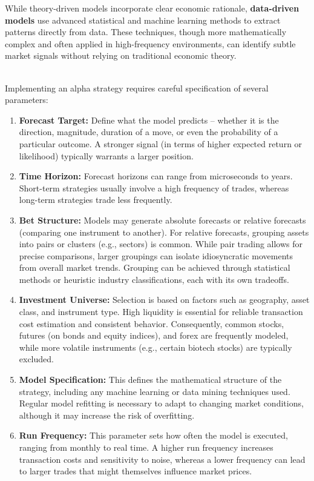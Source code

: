 While theory-driven models incorporate clear economic rationale, \textbf{data-driven models} use advanced statistical and machine learning methods to extract patterns directly from data. These techniques, though more mathematically complex and often applied in high-frequency environments, can identify subtle market signals without relying on traditional economic theory.

\begin{method} \\
Implementing an alpha strategy requires careful specification of several parameters:
\begin{enumerate}[label=\roman*.]
  \setlength{\itemsep}{0pt}
  \item \textbf{Forecast Target:}  
  Define what the model predicts – whether it is the direction, magnitude, duration of a move, or even the probability of a particular outcome. A stronger signal (in terms of higher expected return or likelihood) typically warrants a larger position.

  \item \textbf{Time Horizon:}  
  Forecast horizons can range from microseconds to years. Short-term strategies usually involve a high frequency of trades, whereas long-term strategies trade less frequently.

  \item \textbf{Bet Structure:}  
  Models may generate absolute forecasts or relative forecasts (comparing one instrument to another). For relative forecasts, grouping assets into pairs or clusters (e.g., sectors) is common. While pair trading allows for precise comparisons, larger groupings can isolate idiosyncratic movements from overall market trends. Grouping can be achieved through statistical methods or heuristic industry classifications, each with its own tradeoffs.

  \item \textbf{Investment Universe:}  
  Selection is based on factors such as geography, asset class, and instrument type. High liquidity is essential for reliable transaction cost estimation and consistent behavior. Consequently, common stocks, futures (on bonds and equity indices), and forex are frequently modeled, while more volatile instruments (e.g., certain biotech stocks) are typically excluded.

  \item \textbf{Model Specification:}  
  This defines the mathematical structure of the strategy, including any machine learning or data mining techniques used. Regular model refitting is necessary to adapt to changing market conditions, although it may increase the risk of overfitting.

  \item \textbf{Run Frequency:}  
  This parameter sets how often the model is executed, ranging from monthly to real time. A higher run frequency increases transaction costs and sensitivity to noise, whereas a lower frequency can lead to larger trades that might themselves influence market prices.
\end{enumerate}
\end{method}

